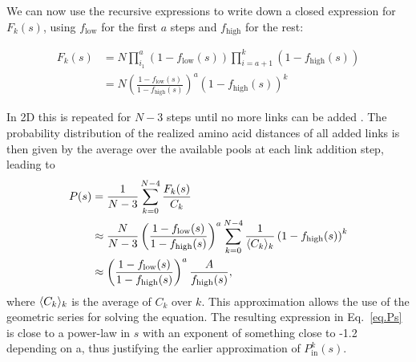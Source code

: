 \documentclass[
reprint,
twocolumn,
amsmath,amssymb,superscriptaddress,aps,
pre]{revtex4-1}
\newcommand{\red}[1]{\textcolor{red!80!black}{#1}}
\DeclarePairedDelimiter{\evdel}{\langle}{\rangle}
\newcommand{\Pin}{P_{\mathrm{in}}}
\newcommand{\fhigh}{f_{\mathrm{high}}}
\newcommand{\flow}{f_{\mathrm{low}}}
\begin{document}
We can now use the recursive expressions to write down a closed expression for $F_k(s)$, using $\flow$ for the first $a$ steps and $\fhigh$ for the rest:

\begin{align}
    F_k(s)&=N\prod_{i_1}^a\left(1-\flow(s)\right)\prod_{i=a+1}^k\left(1-\fhigh(s)\right) \nonumber \\
    &= N\left(\frac{1-\flow(s)}{1-\fhigh(s)}\right)^a\left(1-\fhigh(s)\right)^{k}
\end{align}

In 2D this is repeated for $N-3$ steps until no more links can be added \cite{molkenthin2016scaling}.
The probability distribution of the realized amino acid distances of all added links is then given by the average over the available pools at each link addition step, leading to
\begin{align}
    P(s)&=\frac{1}{N-3}\sum_{k=0}^{N-4} \frac{F_k(s)}{C_k} \nonumber \\
    &\approx \frac{N}{N-3}\left(\frac{1-\flow(s)}{1-\fhigh(s)}\right)^a
\sum_{k=0}^{N-4} \frac{1}{\evdel{C_k}_k} \left(1-\fhigh(s)\right)^{k} \nonumber \\
    &\approx \left(\frac{1-\flow(s)}{1-\fhigh(s)}\right)^a\frac{A}{\fhigh(s)},
    \label{eq.Ps}
\end{align}
where $\evdel{C_k}_k$ is the average of $C_k$ over $k$.
This approximation allows the use of the geometric series for solving the equation. 
The resulting expression in Eq.~\ref{eq.Ps} is close to a power-law in $s$ with an exponent of \red{something close to -1.2 depending on a}, thus justifying the earlier approximation of $\Pin^k(s)$.
\end{document}
